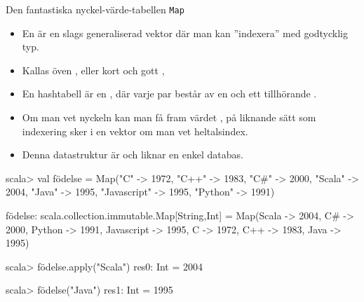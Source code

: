 \begin{Slide}{Den fantastiska nyckel-värde-tabellen \texttt{Map}}\SlideFontSmall
\begin{itemize}
\item En   är en slags generaliserad vektor där man kan ''indexera'' med godtycklig typ. 

\item Kallas öven \href{https://sv.wikipedia.org/wiki/Hashtabell}{} ,   eller kort och gott  ,

\item En hashtabell är en , där varje par består av en   och ett tillhörande . 

\item Om man vet nyckeln kan man få fram värdet , på liknande sätt som indexering sker i en vektor om man vet heltalsindex. 

\item Denna datastruktur är  och liknar en enkel databas.
\end{itemize}
\begin{REPL}
scala> val födelse = Map("C" -> 1972,  "C++" -> 1983, "C#" -> 2000, 
  "Scala" -> 2004, "Java" -> 1995, "Javascript" -> 1995, "Python" -> 1991)

födelse: scala.collection.immutable.Map[String,Int] = Map(Scala -> 2004, C# -> 2000, Python -> 1991, Javascript -> 1995, C -> 1972, C++ -> 1983, Java -> 1995)
  
scala> födelse.apply("Scala")
res0: Int = 2004

scala> födelse("Java")
res1: Int = 1995

\end{REPL}
\end{Slide}

